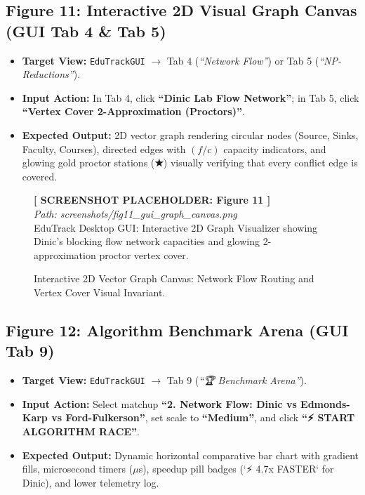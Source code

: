 \subsection{Figure 11: Interactive 2D Visual Graph Canvas (GUI Tab 4 \& Tab 5)}
\begin{itemize}
    \item \textbf{Target View:} \texttt{EduTrackGUI} $\to$ Tab 4 (\textit{``Network Flow''}) or Tab 5 (\textit{``NP-Reductions''}).
    \item \textbf{Input Action:} In Tab 4, click \textbf{``Dinic Lab Flow Network''}; in Tab 5, click \textbf{``Vertex Cover 2-Approximation (Proctors)''}.
    \item \textbf{Expected Output:} 2D vector graph rendering circular nodes (Source, Sinks, Faculty, Courses), directed edges with $(f / c)$ capacity indicators, and glowing gold proctor stations (\textbf{★}) visually verifying that every conflict edge is covered.
\end{itemize}

\begin{figure}[H]
\centering
\begin{tcolorbox}[colback=white,colframe=codegray,width=0.92\textwidth,halign=center]
\vspace{0.8cm}
\textbf{[ SCREENSHOT PLACEHOLDER: Figure 11 ]}\\
\textit{Path: screenshots/fig11_gui_graph_canvas.png}\\
\small EduTrack Desktop GUI: Interactive 2D Graph Visualizer showing Dinic's blocking flow network capacities and glowing 2-approximation proctor vertex cover.
\vspace{0.8cm}
\end{tcolorbox}
\caption{Interactive 2D Vector Graph Canvas: Network Flow Routing and Vertex Cover Visual Invariant.}
\label{fig:ss_graph_canvas}
\end{figure}

\subsection{Figure 12: Algorithm Benchmark Arena (GUI Tab 9)}
\begin{itemize}
    \item \textbf{Target View:} \texttt{EduTrackGUI} $\to$ Tab 9 (\textit{``🏆 Benchmark Arena''}).
    \item \textbf{Input Action:} Select matchup \textbf{``2. Network Flow: Dinic vs Edmonds-Karp vs Ford-Fulkerson''}, set scale to \textbf{``Medium''}, and click \textbf{``⚡ START ALGORITHM RACE''}.
    \item \textbf{Expected Output:} Dynamic horizontal comparative bar chart with gradient fills, microsecond timers ($\mu$s), speedup pill badges (`⚡ 4.7x FASTER` for Dinic), and lower telemetry log.
\end{itemize}


